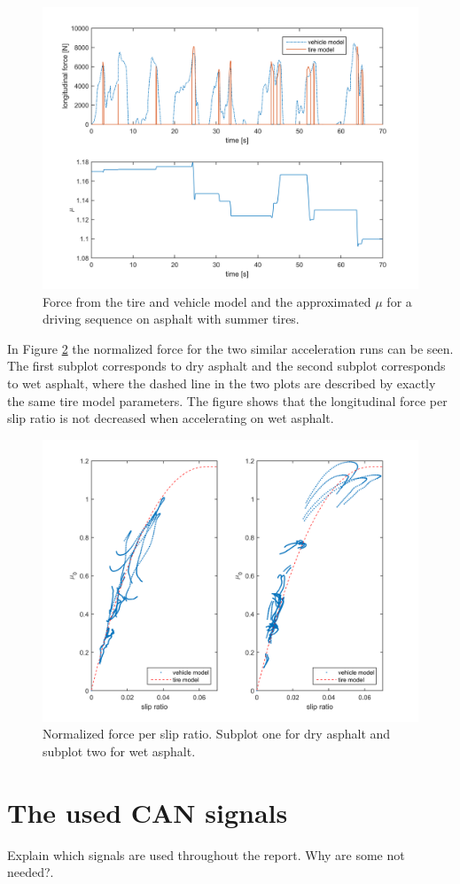 \begin{figure}[h]
	\centering
	\includegraphics[width=1.0\textwidth]{Pictures/force_mue_blot_race_bb}
	\caption {Force from the tire and vehicle model and the approximated $ \mu $ for a driving sequence on asphalt with summer tires.}
	\label{force_mue_blot_race_bb}
\end{figure}

In Figure \ref{slip_kraft_blot_och_torr} the normalized force for the two similar acceleration runs can be seen. The first subplot corresponds to dry asphalt and the second subplot corresponds to wet asphalt, where the dashed line in the two plots are described by exactly the same tire model parameters. The figure shows that the longitudinal force per slip ratio is not decreased when accelerating on wet asphalt. 

\begin{figure}[h]
	\centering
	\includegraphics[width=1.0\textwidth]{Pictures/slip_kraft_blot_och_torr}
	\caption {Normalized force per slip ratio. Subplot one for dry asphalt and subplot two for wet asphalt.}
	\label{slip_kraft_blot_och_torr}
\end{figure}

\section{The used CAN signals}
Explain which signals are used throughout the report. Why are some not needed?.
